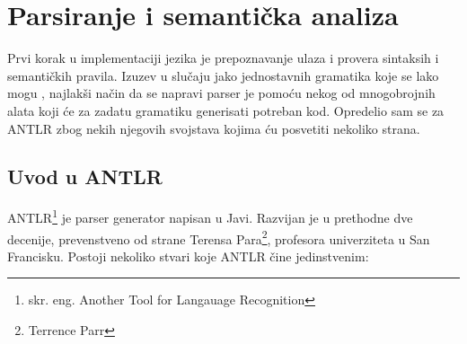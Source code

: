 \chapter{Parsiranje i semantička analiza}

Prvi korak u implementaciji jezika je prepoznavanje ulaza i provera sintaksih i semantičkih pravila. Izuzev u slučaju jako jednostavnih gramatika koje se lako mogu , najlakši način da se napravi parser je pomoću nekog od mnogobrojnih alata koji će za zadatu gramatiku generisati potreban kod. Opredelio sam se za ANTLR zbog nekih njegovih svojstava kojima ću posvetiti nekoliko strana.

\section{Uvod u ANTLR}

ANTLR\footnote{skr. eng. Another Tool for Langauage Recognition} je parser generator napisan u Javi. Razvijan je u prethodne dve decenije, prevenstveno od strane Terensa Para\footnote{Terrence Parr}, profesora univerziteta u San Francisku. Postoji nekoliko stvari koje ANTLR čine jedinstvenim\cite{antlr-contrib}:

